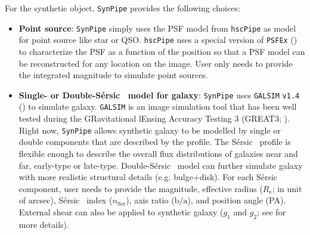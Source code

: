 \documentclass[useamsfonts]{pasj01}
\def\ser{{S\'{e}rsic\ }}
\def\hscpipe{\texttt{hscPipe}}
\def\synpipe{\texttt{SynPipe}}
\def\galsim{\texttt{G}{\scriptsize \texttt{AL}}\texttt{S}{\scriptsize \texttt{IM}}}
\begin{document}
    For the synthetic object, \synpipe{} provides the following choices: 
    
    \begin{itemize}
        
        \item \textbf{Point source}: 
            \synpipe{} simply uses the PSF model from \hscpipe{} as model for 
            point source like star or QSO. 
            \hscpipe{} uses a special version of \texttt{PSFEx} 
            (\citealt{Bertin2011, Bertin2013}) to characterize the PSF as a function 
            of the position so that a PSF model can be reconstructed for any location 
            on the image. 
            User only needs to provide the integrated magnitude to simulate 
            point sources. 
            
        \item \textbf{Single- or Double-\ser{} model for galaxy}: 
            \texttt{SynPipe} uses \galsim{} \texttt{v1.4} (\citealt{Rowe2015}) to 
            simulate galaxy. 
            \galsim{} is an image simulation tool that has been well tested during 
            the GRavitational lEnsing Accuracy Testing 3 (GREAT3; 
            \citealt{Mandelbaum2014}). 
            Right now, \synpipe{} allows synthetic galaxy to be modelled by single 
            or double components that are described by the \citet{Sersic1963} 
            profile.  
            The \ser{} profile is flexible enough to describe the overall flux 
            distributions of galaxies near and far, early-type or late-type. 
            Double-\ser{} model can further simulate galaxy with more realistic 
            structural details (e.g. bulge$+$disk).
            For each \ser{} component, user needs to provide the magnitude, 
            effective radius ($R_{\mathrm{e}}$; in unit of arcsec), \ser{} index 
            ($n_{\mathrm{Ser}}$), axis ratio ($\mathrm{b}/\mathrm{a}$), and position 
            angle (PA).
            External shear can also be applied to synthetic galaxy ($g_1$ and $g_2$; 
            see \citealt{Rowe2015} for more details).
            

\end{itemize}
\end{document}
